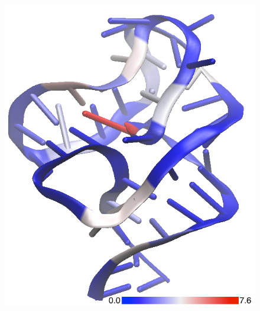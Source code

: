 \documentclass[12pt]{article}
\begin{document}
\begin{figure}[h!]
\begin{center}
{\includegraphics[scale=0.15]{pictures/example_3D_3d.png}}

\end{center}
\end{figure}
\end{document}
